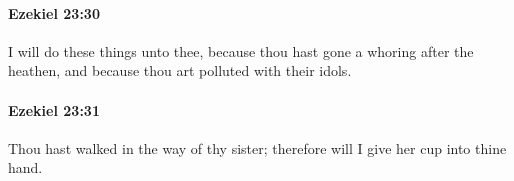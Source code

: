 		\paragraph{Ezekiel 23:30} %
			\label{EZEKIEL-23-30}

			I will do these things unto thee, because thou hast gone a whoring after the heathen, and because thou art polluted with their idols.


		\paragraph{Ezekiel 23:31} %
			\label{EZEKIEL-23-31}

			Thou hast walked in the way of thy sister; therefore will I give her cup into thine hand.


